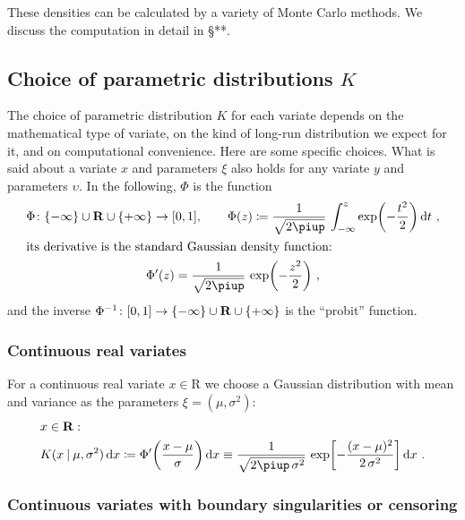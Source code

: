 \documentclass[a4paper,12pt,%
onecolumn,oneside,article,%
british%
]{memoir}
\newcommand*{\pu}{\piup}%
\newcommand*{\di}{\mathop{}\!\mathrm{d}}%
\newcommand*{\RR}{\bm{\mathrm{R}}}
\newcommand*{\defd}{\coloneqq}
\DeclarePairedDelimiter\clcl{[}{]}
\DeclarePairedDelimiter\set{\{}{\}} %
\renewcommand*{\|}[1][]{\nonscript\:#1\vert\nonscript\:\mathopen{}}
\newcommand*{\sect}{\S}%
\newcommand*{\mur}{\mu}
\newcommand*{\sigmar}{\sigma}
\begin{document}
These densities can be calculated by a variety of Monte Carlo methods. We discuss the computation in detail in \sect***.

\subsection{Choice of parametric distributions $K$}
\label{sec:choice_K}

The choice of parametric distribution $K$ for each variate depends on the mathematical type of variate, on the kind of long-run distribution we expect for it, and on computational convenience. Here are some specific choices. What is said about a variate $x$ and parameters $\xi$ also holds for any variate $y$ and parameters $\upsilon$. In the following, $\Phi$ is the function
\begin{gather}
  \label{eq:Phi}
  \Phi \colon  \set{-\infty}\cup\RR\cup\set{+\infty}\to\clcl{0,1},
  \qquad
  \Phi(z) \defd \frac{1}{\sqrt{2\pu}}\, \int_{-\infty}^{z} \exp\biggl(-\frac{t^{2}}{2}\biggr) \di t \ ,
  \\\shortintertext{its derivative is the standard Gaussian density function:}
  \Phi'(z) =  \frac{1}{\sqrt{2\pu}}\,\exp\biggl(-\frac{z^{2}}{2}\biggr) \ ,
\end{gather}
and the inverse $\Phi^{-1}\colon \clcl{0,1}\to\set{-\infty}\cup\RR\cup\set{+\infty}$ is the \enquote{probit} function.





\subsubsection{Continuous real variates}
\label{sec:variates_real}

For a continuous real variate $x \in \RR$ we choose a Gaussian distribution with mean and variance as the parameters $\xi=(\mur, \sigmar^{2})$:
\begin{equation}
  \label{eq:K_unb_cont}
  \begin{split}
    &x \in \RR:
    \\
  &K(x \| \mur,\sigmar^{2})\di x \defd \Phi'\biggl(\frac{x-\mur}{\sigmar}\biggr) \di x
  \equiv \frac{1}{\sqrt{2\pu\,\sigmar^{2}}}\,
  \exp\biggl[-\frac{(x-\mur)^{2}}{2\,\sigmar^{2}}\biggr] \di x \ .
\end{split}
\end{equation}

\subsubsection{Continuous variates with boundary singularities or censoring}
\label{sec:variates_censored}
\end{document}

